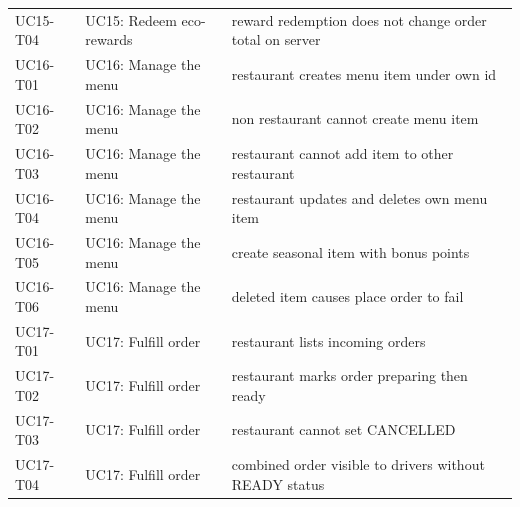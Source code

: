 \begin{table}[t]
\begin{tabular}{p{3.2cm}p{4.0cm}p{5.8cm}}
UC15-T04 & UC15: Redeem eco-rewards & reward redemption does not change order total on server \\
UC16-T01 & UC16: Manage the menu & restaurant creates menu item under own id \\
UC16-T02 & UC16: Manage the menu & non restaurant cannot create menu item \\
UC16-T03 & UC16: Manage the menu & restaurant cannot add item to other restaurant \\
UC16-T04 & UC16: Manage the menu & restaurant updates and deletes own menu item \\
UC16-T05 & UC16: Manage the menu & create seasonal item with bonus points \\
UC16-T06 & UC16: Manage the menu & deleted item causes place order to fail \\
UC17-T01 & UC17: Fulfill order & restaurant lists incoming orders \\
UC17-T02 & UC17: Fulfill order & restaurant marks order preparing then ready \\
UC17-T03 & UC17: Fulfill order & restaurant cannot set CANCELLED \\
UC17-T04 & UC17: Fulfill order & combined order visible to drivers without READY status \\
\bottomrule
\end{tabular}
\end{table}

